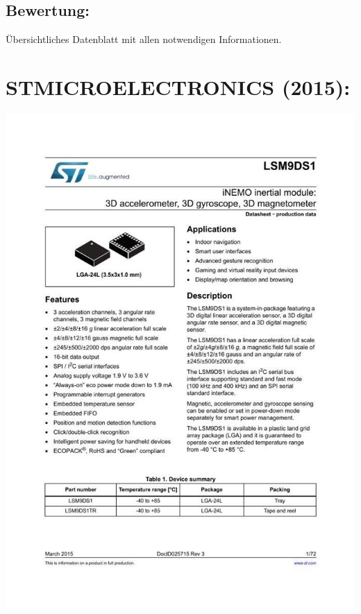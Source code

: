 \subsection*{Bewertung:}
Übersichtliches Datenblatt mit allen notwendigen Informationen.

\section*{STMICROELECTRONICS (2015):}
\begin{minipage}{0.5\textwidth}
	\includegraphics[width=\linewidth]{../Appendix/Literaturverzeichnis/img/STM.jpg}
\end{minipage}
\hfill
